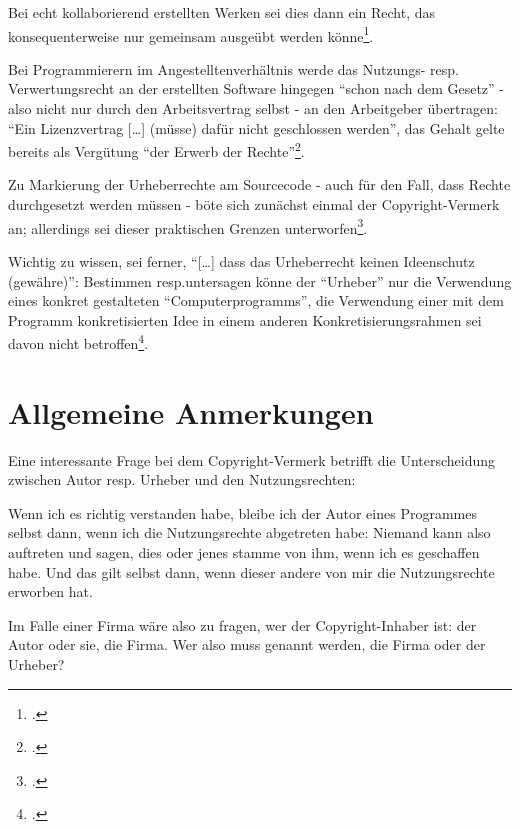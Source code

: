 \documentclass[DIV=calc,BCOR=5mm,11pt,headings=small,oneside,abstract=true, toc=bib]{scrartcl}
\begin{document}
Bei echt kollaborierend erstellten Werken sei dies dann ein Recht, das
konsequenterweise nur gemeinsam ausgeübt werden könne\footcite[vgl.][164]{Kreutzer2008b}. 

Bei Programmierern im Angestelltenverhältnis werde das Nutzungs- resp.
Verwertungsrecht an der erstellten Software hingegen \enquote{schon nach dem
Gesetz} - also nicht nur durch den Arbeitsvertrag selbst - an den
Arbeitgeber übertragen: \enquote{Ein Lizenzvertrag [\ldots] (müsse) dafür nicht
geschlossen werden}, das Gehalt gelte bereits als Vergütung \enquote{der
Erwerb der Rechte}\footcite[vgl.][164]{Kreutzer2008b}.

Zu Markierung der Urheberrechte am Sourcecode - auch für den Fall, dass Rechte
durchgesetzt werden müssen - böte sich zunächst einmal der Copyright-Vermerk an;
allerdings sei dieser praktischen Grenzen unterworfen\footcite[vgl.][166f]{Kreutzer2008b}.

Wichtig zu wissen, sei ferner, \enquote{[\ldots] dass das Urheberrecht keinen
Ideenschutz (gewähre)}: Bestimmen resp.untersagen könne der \enquote{Urheber}
nur die Verwendung eines konkret gestalteten \enquote{Computerprogramms}, die
Verwendung einer mit dem Programm konkretisierten Idee in einem anderen
Konkretisierungsrahmen sei davon nicht
betroffen\footcite[vgl.][167]{Kreutzer2008b}.

\section{Allgemeine Anmerkungen}

Eine interessante Frage bei dem Copyright-Vermerk betrifft die Unterscheidung
zwischen Autor resp. Urheber und den Nutzungsrechten: 

Wenn ich es richtig
verstanden habe, bleibe ich der Autor eines Programmes selbst dann, wenn ich die
Nutzungsrechte abgetreten habe: Niemand kann also auftreten und sagen, dies oder
jenes stamme von ihm, wenn ich es geschaffen habe. Und das gilt selbst dann,
wenn dieser andere von mir die Nutzungsrechte erworben hat.

Im Falle einer Firma wäre also zu fragen, wer der Copyright-Inhaber ist: der
Autor oder sie, die Firma. Wer also muss genannt werden, die Firma oder der
Urheber?

\small

\end{document}
